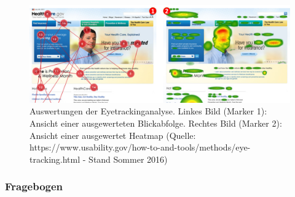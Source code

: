 \documentclass[Bachelorarbeit.tex]{subfiles}
\begin{document}
\begin{figure}[H]
\centering
\includegraphics[width=1\linewidth]{img/Evaluation/Eyetracking}
\caption[Auswertungen der Eyetrackinganalyse]{Auswertungen der Eyetrackinganalyse. Linkes Bild (Marker 1): Ansicht einer ausgewerteten Blickabfolge. Rechtes Bild (Marker 2): Ansicht einer ausgewertet Heatmap (Quelle: https://www.usability.gov/how-to-and-tools/methods/eye-tracking.html - Stand Sommer 2016)}
\label{fig:Eyetracking}
\end{figure}


\subsubsection{Fragebogen}
\label{FragebogenEvaluation}
\end{document}

